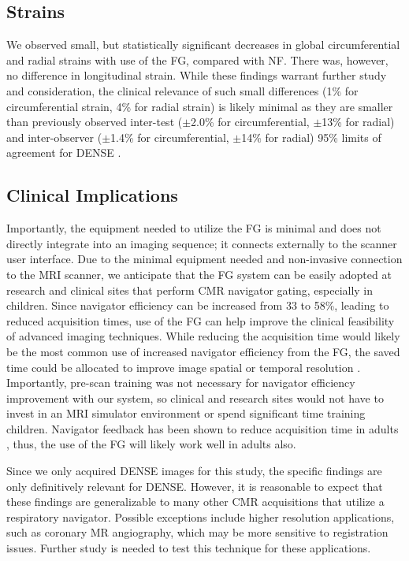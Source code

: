 	\subsection{Strains}
		We observed small, but statistically significant decreases in global circumferential and radial strains with use of the FG, compared with NF. There was, however, no difference in longitudinal strain. While these findings warrant further study and consideration, the clinical relevance of such small differences (1\% for circumferential strain, 4\% for radial strain) is likely minimal as they are smaller than previously observed inter-test ($\pm$2.0\% for circumferential, $\pm$13\% for radial) and inter-observer ($\pm$1.4\% for circumferential, $\pm$14\% for radial) 95\% limits of agreement for DENSE \cite{Wehner2015,Wehner2015a}.
	
	\subsection{Clinical Implications}
		Importantly, the equipment needed to utilize the FG is minimal and does not directly integrate into an imaging sequence; it connects externally to the scanner user interface. Due to the minimal equipment needed and non-invasive connection to the MRI scanner, we anticipate that the FG system can be easily adopted at research and clinical sites that perform CMR navigator gating, especially in children. Since navigator efficiency can be increased from 33 to 58\%, leading to reduced acquisition times, use of the FG can help improve the clinical feasibility of advanced imaging techniques. While reducing the acquisition time would likely be the most common use of increased navigator efficiency from the FG, the saved time could be allocated to improve image spatial or temporal resolution \cite{Feuerlein2009}. Importantly, pre-scan training was not necessary for navigator efficiency improvement with our system, so clinical and research sites would not have to invest in an MRI simulator environment or spend significant time training children. Navigator feedback has been shown to reduce acquisition time in adults \cite{Feuerlein2009}, thus, the use of the FG will likely work well in adults also.
		
		Since we only acquired DENSE images for this study,	the specific findings are only definitively relevant for DENSE. However, it is reasonable to expect that these findings are generalizable to many other CMR acquisitions that utilize a respiratory navigator. Possible exceptions include higher resolution applications, such as coronary MR angiography, which may be more sensitive to registration issues. Further study is needed to test this technique for these applications.
		
